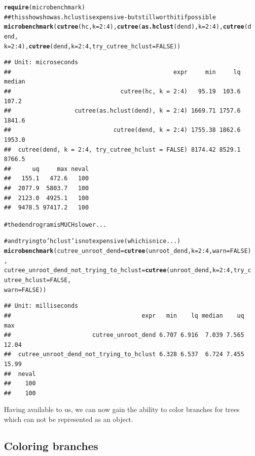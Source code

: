 \documentclass[shortnames,nojss,article]{jss}\usepackage{graphicx, color}
\makeatletter
\newcommand{\hlfunctioncall}[1]{\textcolor[rgb]{0.501960784313725,0,0.329411764705882}{\textbf{#1}}}%
\newcommand{\hlcomment}[1]{\textcolor[rgb]{0.180392156862745,0.6,0.341176470588235}{#1}}%
\newenvironment{kframe}{%
 \def\at@end@of@kframe{}%
 \ifinner\ifhmode%
  \def\at@end@of@kframe{\end{minipage}}%
  \begin{minipage}{\columnwidth}%
 \fi\fi%
 \def\FrameCommand##1{\hskip\@totalleftmargin \hskip-\fboxsep
 \colorbox{shadecolor}{##1}\hskip-\fboxsep
     \hskip-\linewidth \hskip-\@totalleftmargin \hskip\columnwidth}%
 \MakeFramed {\advance\hsize-\width
   \@totalleftmargin\z@ \linewidth\hsize
   \@setminipage}}%
 {\par\unskip\endMakeFramed%
 \at@end@of@kframe}
\newenvironment{knitrout}{}{} %
\makeatother
\begin{document}
\begin{knitrout}
\begin{kframe}
\begin{alltt}
\hlfunctioncall{require}(microbenchmark)
\hlcomment{## this shows how as.hclust is expensive - but still worth it if possible}
\hlfunctioncall{microbenchmark}(\hlfunctioncall{cutree}(hc, k = 2:4), \hlfunctioncall{cutree}(\hlfunctioncall{as.hclust}(dend), k = 2:4), \hlfunctioncall{cutree}(dend, 
    k = 2:4), \hlfunctioncall{cutree}(dend, k = 2:4, try_cutree_hclust = FALSE))
\end{alltt}
\begin{verbatim}
## Unit: microseconds
##                                              expr     min     lq median
##                               cutree(hc, k = 2:4)   95.19  103.6  107.2
##                  cutree(as.hclust(dend), k = 2:4) 1669.71 1757.6 1841.6
##                             cutree(dend, k = 2:4) 1755.38 1862.6 1953.0
##  cutree(dend, k = 2:4, try_cutree_hclust = FALSE) 8174.42 8529.1 8766.5
##      uq     max neval
##   155.1   472.6   100
##  2077.9  5803.7   100
##  2123.0  4925.1   100
##  9478.5 97417.2   100
\end{verbatim}
\begin{alltt}
\hlcomment{# the dendrogram is MUCH slower...}


\hlcomment{# and trying to 'hclust' is not expensive (which is nice...)}
\hlfunctioncall{microbenchmark}(cutree_unroot_dend = \hlfunctioncall{cutree}(unroot_dend, k = 2:4, warn = FALSE), 
    cutree_unroot_dend_not_trying_to_hclust = \hlfunctioncall{cutree}(unroot_dend, k = 2:4, try_cutree_hclust = FALSE, 
        warn = FALSE))
\end{alltt}
\begin{verbatim}
## Unit: milliseconds
##                                     expr   min    lq median    uq   max
##                       cutree_unroot_dend 6.707 6.916  7.039 7.565 12.04
##  cutree_unroot_dend_not_trying_to_hclust 6.328 6.537  6.724 7.455 15.99
##  neval
##    100
##    100
\end{verbatim}
\begin{alltt}

\end{alltt}
\end{kframe}
\end{knitrout}



Having  available to us, we can now gain the ability to color branches for trees which can not be represented as an  object.

\subsection{Coloring branches}
\end{document}
